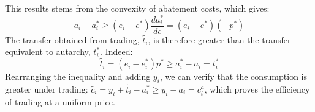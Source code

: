 \documentclass[12pt,english]{article}
\begin{document}



This results stems from the convexity of abatement costs, which gives: $$a_i - a^*_i \geq (e_i - e^*) \frac{da^*_i}{de} = (e_i - e^*) (-p^*)$$ 
The transfer obtained from trading, $\widetilde{t_i}$, is therefore greater than the transfer equivalent to autarchy, $t^*_i$. Indeed: $$\widetilde{t_i} = (e_i - e^*_i ) p^* \geq a^*_i - a_i = t^*_i$$
Rearranging the inequality and adding $y_i$, we can verify that the consumption is greater under trading: %
$\widetilde{c_i} = y_i + \widetilde{t_i} - a^*_i \geq y_i - a_i = c^a_i$, which proves the efficiency of trading at a uniform price.


\end{document}
